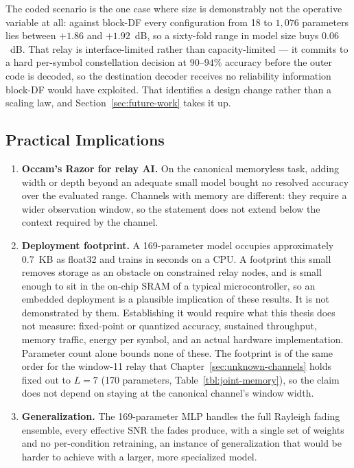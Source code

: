 The coded scenario is the one case where size is demonstrably not the operative variable at all: against
block-DF every configuration from 18 to $1{,}076$ parameters lies between $+1.86$ and $+1.92$~dB, so a
sixty-fold range in model size buys $0.06$~dB. That relay is interface-limited rather than capacity-limited
--- it commits to a hard per-symbol constellation decision at $90$--$94\%$ accuracy before the outer code is
decoded, so the destination decoder receives no reliability information block-DF would have exploited. That
identifies a design change rather than a scaling law, and Section~\ref{sec:future-work} takes it up.

\subsection{Practical Implications}\label{sec:practical-implications}

\begin{enumerate}
\def\labelenumi{\arabic{enumi}.}
\item
  \textbf{Occam's Razor for relay AI.} On the canonical memoryless task, adding width or depth beyond an adequate small model bought no resolved accuracy over the evaluated range. Channels with memory are different: they require a wider observation window, so the statement does not extend below the context required by the channel.
\item
  \textbf{Deployment footprint.} A 169-parameter model occupies approximately 0.7~KB as float32 and trains in seconds on a CPU. A footprint this small removes storage as an obstacle on constrained relay nodes, and is small enough to sit in the on-chip SRAM of a typical microcontroller, so an embedded deployment is a plausible implication of these results. It is not demonstrated by them. Establishing it would require what this thesis does not measure: fixed-point or quantized accuracy, sustained throughput, memory traffic, energy per symbol, and an actual hardware implementation. Parameter count alone bounds none of these. The footprint is of the same order for the window-11 relay that Chapter~\ref{sec:unknown-channels} holds fixed out to $L=7$ (170 parameters, Table~\ref{tbl:joint-memory}), so the claim does not depend on staying at the canonical channel's window width.
\item
  \textbf{Generalization.} The 169-parameter MLP handles the full Rayleigh fading ensemble, every effective SNR the fades produce, with a single set of weights and no per-condition retraining, an instance of generalization that would be harder to achieve with a larger, more specialized model.
\end{enumerate}


